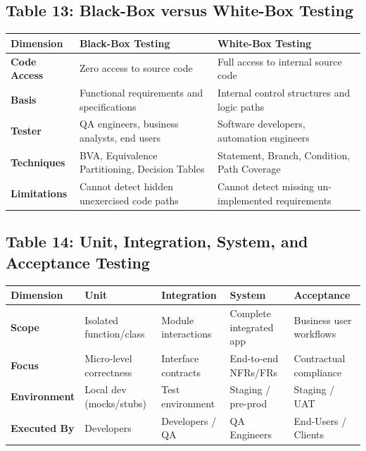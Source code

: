 \subsection*{Table 13: Black-Box versus White-Box Testing}
\begin{center}
\small
\begin{tabularx}{\textwidth}{lXX}
\toprule
\textbf{Dimension} & \textbf{Black-Box Testing} & \textbf{White-Box Testing} \\
\midrule
\textbf{Code Access} & Zero access to source code & Full access to internal source code \\
\textbf{Basis} & Functional requirements and specifications & Internal control structures and logic paths \\
\textbf{Tester} & QA engineers, business analysts, end users & Software developers, automation engineers \\
\textbf{Techniques} & BVA, Equivalence Partitioning, Decision Tables & Statement, Branch, Condition, Path Coverage \\
\textbf{Limitations} & Cannot detect hidden unexercised code paths & Cannot detect missing un-implemented requirements \\
\bottomrule
\end{tabularx}
\end{center}

\subsection*{Table 14: Unit, Integration, System, and Acceptance Testing}
\begin{center}
\small
\begin{tabularx}{\textwidth}{lXXXX}
\toprule
\textbf{Dimension} & \textbf{Unit} & \textbf{Integration} & \textbf{System} & \textbf{Acceptance} \\
\midrule
\textbf{Scope} & Isolated function/class & Module interactions & Complete integrated app & Business user workflows \\
\textbf{Focus} & Micro-level correctness & Interface contracts & End-to-end NFRs/FRs & Contractual compliance \\
\textbf{Environment} & Local dev (mocks/stubs) & Test environment & Staging / pre-prod & Staging / UAT \\
\textbf{Executed By} & Developers & Developers / QA & QA Engineers & End-Users / Clients \\
\bottomrule
\end{tabularx}
\end{center}

